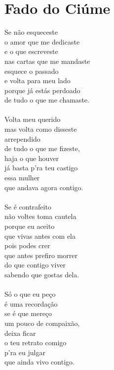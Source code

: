 \documentclass{article}
\begin{document}
\section{ Fado do Ciúme}
Se não esqueceste\\
o amor que me dedicaste\\
e o que escreveste\\
nas cartas que me mandaste\\
esquece o passado \\
e volta para meu lado\\
porque já estás perdoado\\
de tudo o que me chamaste.\\
\\
Volta meu querido\\
mas volta como disseste\\
arrependido\\
de tudo o que me fizeste,\\
haja o que houver\\
já basta p'ra teu castigo\\
essa mulher \\
que andava agora contigo.\\
\\
Se é contrafeito\\
não voltes toma cautela\\
porque eu aceito\\
que vivas antes com ela\\
pois podes crer\\
que antes prefiro morrer\\
do que contigo viver\\
sabendo que gostas dela.\\
\\
Só o que eu peço \\
é uma recordação\\
se é que mereço\\
um pouco de compaixão,\\
deixa ficar \\
o teu retrato comigo\\
p'ra eu julgar\\
que ainda vivo contigo.\\
\\
\end{document}
